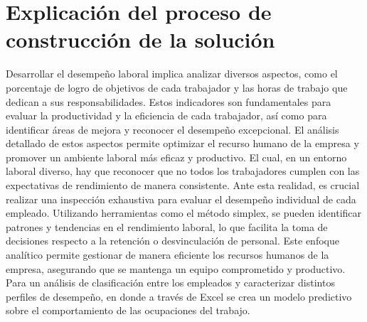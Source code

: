 \documentclass{plantillauft}
\begin{document}
\section{Explicación del proceso de construcción de la solución}
Desarrollar el desempeño laboral implica analizar diversos aspectos, como el porcentaje de logro de objetivos de cada trabajador y las horas de trabajo que dedican a sus responsabilidades. Estos indicadores son fundamentales para evaluar la productividad y la eficiencia de cada trabajador, así como para identificar áreas de mejora y reconocer el desempeño excepcional. El análisis detallado de estos aspectos permite optimizar el recurso humano de la empresa y promover un ambiente laboral más eficaz y productivo. El cual, en un entorno laboral diverso, hay que reconocer que no todos los trabajadores cumplen con las expectativas de rendimiento de manera consistente. Ante esta realidad, es crucial realizar una inspección exhaustiva para evaluar el desempeño individual de cada empleado. Utilizando herramientas como el método simplex, se pueden identificar patrones y tendencias en el rendimiento laboral, lo que facilita la toma de decisiones respecto a la retención o desvinculación de personal. Este enfoque analítico permite gestionar de manera eficiente los recursos humanos de la empresa, asegurando que se mantenga un equipo comprometido y productivo.
\newline
\newline
Para un análisis de clasificación entre los empleados y caracterizar distintos perfiles de desempeño, en donde a través de Excel se crea un modelo predictivo sobre el comportamiento de las ocupaciones del trabajo.
\end{document}
